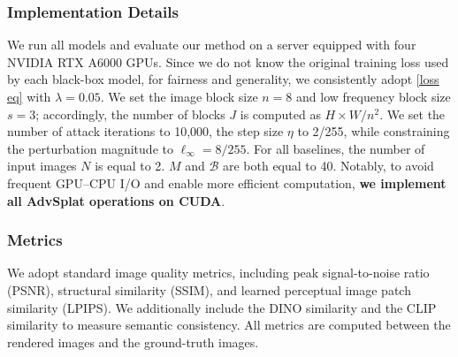 \documentclass[runningheads]{llncs}
\begin{document}
\subsubsection{Implementation Details}
We run all models and evaluate our method on a server equipped with four NVIDIA RTX A6000 GPUs. Since we do not know the original training loss used by each black-box model, for fairness and generality, we consistently adopt \cref{loss eq} with $\lambda = 0.05$. We set the image block size $n = 8$ and low frequency block size $s = 3$; accordingly, the number of blocks $J$ is computed as $H\times{W}/n^2$. We set the number of attack iterations to 10,000, the step size $\eta$ to 2/255, while constraining the perturbation magnitude to $\ell_\infty=8/255$. For all baselines, the number of input images $N$ is equal to 2. $M$ and $\mathcal{B}$ are both equal to 40. Notably, to avoid frequent GPU–CPU I/O and enable more efficient computation, \textbf{we implement all AdvSplat operations on CUDA}.


\subsubsection{Metrics}
We adopt standard image quality metrics, including peak signal-to-noise ratio (PSNR), structural similarity (SSIM)\cite{wang2004image}, and learned perceptual image patch similarity (LPIPS)\cite{zhang2018unreasonable}. We additionally include the DINO\cite{zhang2022dino} similarity and the CLIP\cite{radford2021learning} similarity to measure semantic consistency. All metrics are computed between the rendered images and the ground-truth images.
\end{document}
